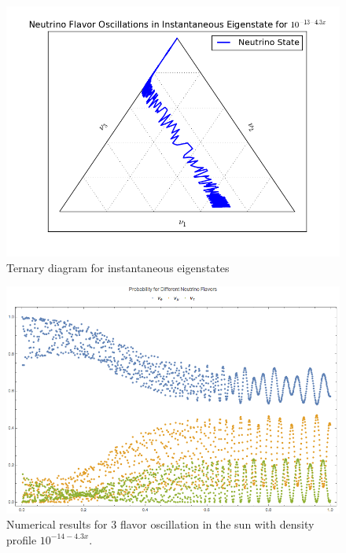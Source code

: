 \documentclass{tufte-handout}
\begin{document}
\begin{figure}
\centering
\includegraphics{assets/ternary/matter-inst-eigen-e-1.png}
\caption{Ternary diagram for instantaneous eigenstates}
\label{fig:matter-inst-eigen-e-1}
\end{figure}



\begin{figure}
\centering
\includegraphics{assets/numericalMSW3Flavor-minus14matter.png}
\caption{Numerical results for 3 flavor oscillation in the sun with density profile $10^{-14 - 4.3 x}$.}
\label{fig:numericalMSW3Flavor-minus14matter}
\end{figure}
\end{document}
